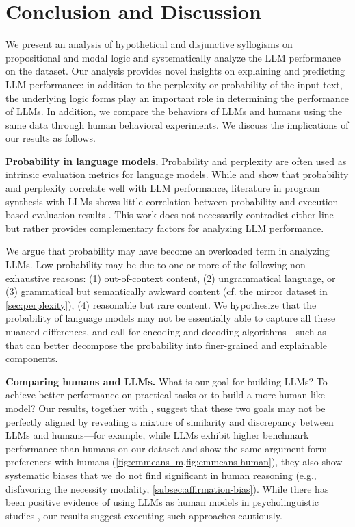 \section{Conclusion and Discussion}
\label{sec:discussion}
We present an analysis of hypothetical and disjunctive syllogisms on propositional and modal logic and systematically analyze the LLM performance on the dataset.
Our analysis provides novel insights on explaining and predicting LLM performance: in addition to the perplexity or probability of the input text, the underlying logic forms play an important role in determining the performance of LLMs.
In addition, we compare the behaviors of LLMs and humans using the same data through human behavioral experiments.
We discuss the implications of our results as follows.

\vspace{2pt}
\noindent\textbf{Probability in language models.}
Probability and perplexity are often used as intrinsic evaluation metrics for language models.
While \citet{gonen-etal-2023-demystifying} and \citet{mccoyEmbersAutoregressionShow2024} show that probability and perplexity correlate well with LLM performance, literature in program synthesis with LLMs shows little correlation between probability and execution-based evaluation results \citep{li2022competition,shi-etal-2022-natural}.
This work does not necessarily contradict either line but rather provides complementary factors for analyzing LLM performance.

We argue that probability may have become an overloaded term in analyzing LLMs.
Low probability may be due to one or more of the following non-exhaustive reasons: (1) out-of-context content, (2) ungrammatical language, or (3) grammatical but semantically awkward content (cf. the mirror dataset in \cref{sec:perplexity}), (4) reasonable but rare content.
We hypothesize that the probability of language models may not be essentially able to capture all these nuanced differences, and call for encoding and decoding algorithms---such as \citet{meister-etal-2023-locally}---that can better decompose the probability into finer-grained and explainable components.

\vspace{2pt}
\noindent\textbf{Comparing humans and LLMs.}
What is our goal for building LLMs?
To achieve better performance on practical tasks or to build a more human-like model?
Our results, together with \citet{eisape-etal-2024-systematic}, suggest that these two goals may not be perfectly aligned by revealing a mixture of similarity and discrepancy between LLMs and humans---for example, while LLMs exhibit higher benchmark performance than humans on our dataset and show the same argument form preferences with humans (\cref{fig:emmeans-lm,fig:emmeans-human}), they also show systematic biases that we do not find significant in human reasoning (e.g., disfavoring the necessity modality, \cref{subsec:affirmation-bias}).
While there has been positive evidence of using LLMs as human models in psycholinguistic studies , our results suggest executing such approaches cautiously.

